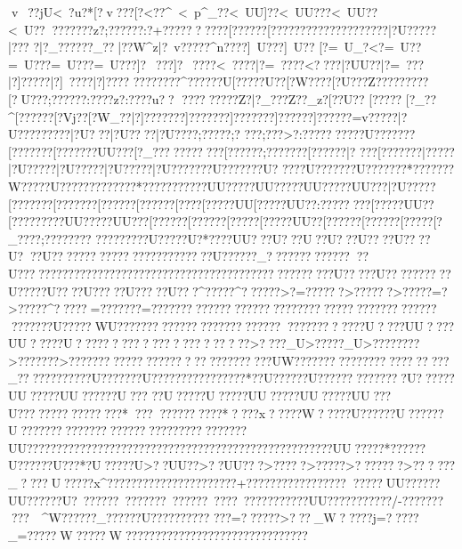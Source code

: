 {{{{{{{{{{{{{{{{{{{{{{{{{{{{{{{{{{{{{{{{{{{{{{{{{{{{{{{{{{{{{{{{{{{{{{{{{{{{{{{{{{{{{{{{{{{{{{{{{{{{{{{{{{{{{{{{{{{{{{{{{{{{{{{{{{{{{{{{{{{{{{{{{{{{{{{{{{{{{{{{{{{{{{{{{{{{{{{{{{{{{{{{{{{{{{{{{{{{{{{{{{{{{{{{{{{{{{{{{{{{{{{{{{{{{{{{{{{{{{{{{{{{{{{{{{{{{{{{{{{{{{{{{{{{{{{{{{{{{{{{{{{{{{{{{{{{{{{{{{{{{{{{{{{{{{{{{{{{{{{{{{{{{{{{{{{{{{{{{{{{{{{{{{{{{{{{{{{{{{{{{{{{{{{{{{{{{{{{{{{{{{{{{{{{{{{{{{{{{{{{v~??jU<~?u?*  [?v???[?<? ?^~\?<~p^_?}?<~UU]?}?<~UU??}?<~UU??\?<~U?????????z?;?????{?:?+?????? ????[??????[???????{???????\???????|?U?????|???
{?|?_?????}?_??|?}?W^z |?~v????}?^n??? }?]~U???\?]~U??
[?=~U_?<?=~U?? \?=~U???\?=~U???\?=~U???]?~??? ]?~??? }?<~????|?=~???}?<????|?\?UU??|?=~??? |?]?????|?]~????|?]????
???????{?^?  {?????U[?????U??[?W?? ??[?U???Z?????????[?U??{?;?????{?:????z{?:????u{??
?????????Z?|?_???Z?}?_z?[?}?U?? [?}???? [?\?_??^[?\?????}?[?Vj??[?\?W_??|?]???????]???????]???????]???? ??]???? ??=v??? ??|?U?? ??\???? ??|?U? ??|?U????|?U????;? ????;? 
???;?  ??>?:??????{????U?{?? ????[???????[???{????UU???[?_??????  ?????  [??  ????;???????[?????{?|?
???[??? ???{?|?\?????|?U?????|?U?????|?U?????|?U???????U???????U?
 ????U???????U?????{??*???{????W?{????U??{????????? ??*???????????UU?????UU?????UU?????UU???|?U?????[???????[???????[???? ??[???? ??[???? [?????UU[?????UU??:???  ?????  [?????UU??[?????????UU?????UU???[??????[??????[?????[?????UU??[???? ??[???? ??[???  ??[?_?? ??;???? ??{??
 ??{???? ???U?? ???U?* ??? ?UU??  ?U??  ?U??U? ??U?? ??U?? ??U? ??U?? ?????  ?????  ?????  ??????  ??U??????_?  ?????? ????????U??????????????   ?????   ??????  ??????  ??????  ??????  ?????? ???U?? ???U?? ?????? ??U?? ???U?? ??U?????U?????U???^?????^??????>?=??????>??????>?????=?>?????^?????=???????=????????????????????????????????????????????????????U?????WU??????????????????????????????????????U????UU????UU?????U?? ?????  ????  ????  ????   ???   ?>????_U>?????_U>????????>???????>??????????????? ??????   ??????????UW??????? ??????????????? ??_??? ??????? ??U???????U????????????????*??U??????U??? ????? ??????U?  ?????UU?????UU??????U???
??U??? ??U?????UU?????UU?????UU???U???????? ????? ???* ???  ?????? ????* ?? ??x?????W?????U???? ??U??????U????????????????????????????????????UU?????????????????  ?????  ?????  ?????????????????????????UU?????*??????U?  ??? ??U??? *?U?????U>??UU??>??UU???>? ????>?????>???????>?   ??? ??_????U?????x^???? ??????????????????+????? ?????? ???????????UU??????UU??????U?~??????~???????~? ?????~?  ???~???????????UU???????????/-??????????~~^W??????_??????U??????????
???=??????>???_W?????j=?????_=?????W?????W?? ?????? ???????????????????????
}}}}}}}}}}}}}}}}}}}}}}}}}}}}}}}}}}}}}}}}}}}}}}}}}}}}}}}}}}}}}}}}}}}}}}}}}}}}}}}}}}}}}}}}}}}}}}}}}}}}}}}}}}}}}}}}}}}}}}}}}}}}}}}}}}}}}}}}}}}}}}}}}}}}}}}}}}}}}}}}}}}}}}}}}}}}}}}}}}}}}}}}}}}}}}}}}}}}}}}}}}}}}}}}}}}}}}}}}}}}}}}}}}}}}}}}}}}}}}}}}}}}}}}}}}}}}}}}}}}}}}}}}}}}}}}}}}}}}}}}}}}}}}}}}}}}}}}}}}}}}}}}}}}}}}}}}}}}}}}}}}}}}}}}}}}}}}}}}}}}}}}}}}}}}}}}}}}}}}}}}}}}}}}}}}}}}}}}}}}}}}}}}}}}}}}}}}}}}}}}}}}}}}}
